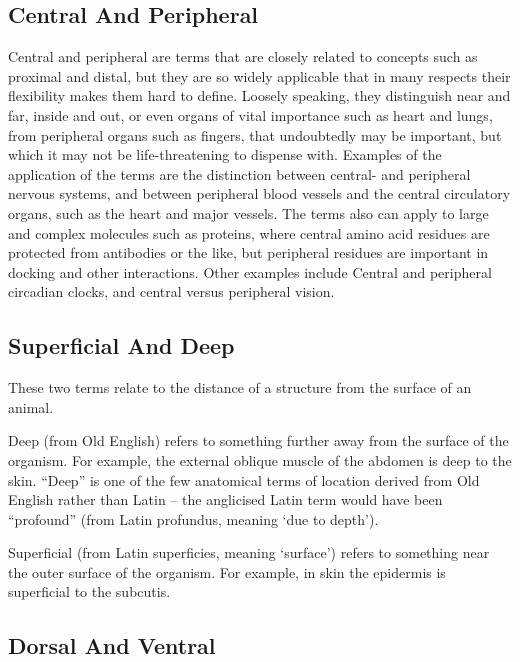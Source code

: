 \hypertarget{central-and-peripheral}{%
\subsection{Central And Peripheral}\label{central-and-peripheral}}

Central and peripheral are terms that are closely related to concepts such as proximal and distal, but they are so widely applicable that in many respects their flexibility makes them hard to define. Loosely speaking, they distinguish near and far, inside and out, or even organs of vital importance such as heart and lungs, from peripheral organs such as fingers, that undoubtedly may be important, but which it may not be life-threatening to dispense with. Examples of the application of the terms are the distinction between central- and peripheral nervous systems, and between peripheral blood vessels and the central circulatory organs, such as the heart and major vessels. The terms also can apply to large and complex molecules such as proteins, where central amino acid residues are protected from antibodies or the like, but peripheral residues are important in docking and other interactions. Other examples include Central and peripheral circadian clocks, and central versus peripheral vision.

\hypertarget{superficial-and-deep}{%
\subsection{Superficial And Deep}\label{superficial-and-deep}}

These two terms relate to the distance of a structure from the surface of an animal.

Deep (from Old English) refers to something further away from the surface of the organism. For example, the external oblique muscle of the abdomen is deep to the skin. ``Deep'' is one of the few anatomical terms of location derived from Old English rather than Latin -- the anglicised Latin term would have been ``profound'' (from Latin profundus, meaning `due to depth').

Superficial (from Latin superficies, meaning `surface') refers to something near the outer surface of the organism. For example, in skin the epidermis is superficial to the subcutis.

\hypertarget{dorsal-and-ventral}{%
\subsection{Dorsal And Ventral}\label{dorsal-and-ventral}}

